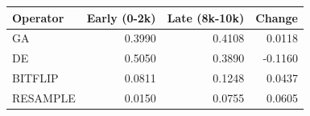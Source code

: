 \begin{tabular}{lrrr}
\toprule
Operator & Early (0-2k) & Late (8k-10k) & Change \\
\midrule
GA & 0.3990 & 0.4108 & 0.0118 \\
DE & 0.5050 & 0.3890 & -0.1160 \\
BITFLIP & 0.0811 & 0.1248 & 0.0437 \\
RESAMPLE & 0.0150 & 0.0755 & 0.0605 \\
\bottomrule
\end{tabular}
